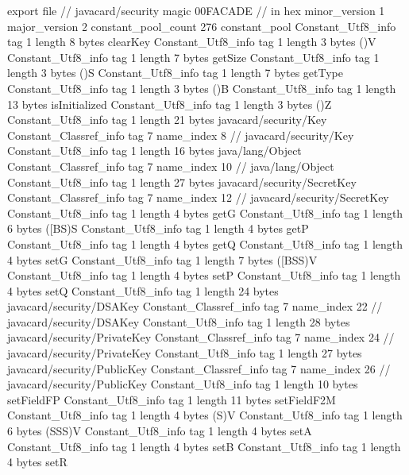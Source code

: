 export file {		// javacard/security
	magic	00FACADE		 // in hex
	minor_version	1
	major_version	2
	constant_pool_count	276
	constant_pool {
		Constant_Utf8_info {
			tag	1
			length	8
			bytes	clearKey
		}
		Constant_Utf8_info {
			tag	1
			length	3
			bytes	()V
		}
		Constant_Utf8_info {
			tag	1
			length	7
			bytes	getSize
		}
		Constant_Utf8_info {
			tag	1
			length	3
			bytes	()S
		}
		Constant_Utf8_info {
			tag	1
			length	7
			bytes	getType
		}
		Constant_Utf8_info {
			tag	1
			length	3
			bytes	()B
		}
		Constant_Utf8_info {
			tag	1
			length	13
			bytes	isInitialized
		}
		Constant_Utf8_info {
			tag	1
			length	3
			bytes	()Z
		}
		Constant_Utf8_info {
			tag	1
			length	21
			bytes	javacard/security/Key
		}
		Constant_Classref_info {
			tag	7
			name_index	8		// javacard/security/Key
		}
		Constant_Utf8_info {
			tag	1
			length	16
			bytes	java/lang/Object
		}
		Constant_Classref_info {
			tag	7
			name_index	10		// java/lang/Object
		}
		Constant_Utf8_info {
			tag	1
			length	27
			bytes	javacard/security/SecretKey
		}
		Constant_Classref_info {
			tag	7
			name_index	12		// javacard/security/SecretKey
		}
		Constant_Utf8_info {
			tag	1
			length	4
			bytes	getG
		}
		Constant_Utf8_info {
			tag	1
			length	6
			bytes	([BS)S
		}
		Constant_Utf8_info {
			tag	1
			length	4
			bytes	getP
		}
		Constant_Utf8_info {
			tag	1
			length	4
			bytes	getQ
		}
		Constant_Utf8_info {
			tag	1
			length	4
			bytes	setG
		}
		Constant_Utf8_info {
			tag	1
			length	7
			bytes	([BSS)V
		}
		Constant_Utf8_info {
			tag	1
			length	4
			bytes	setP
		}
		Constant_Utf8_info {
			tag	1
			length	4
			bytes	setQ
		}
		Constant_Utf8_info {
			tag	1
			length	24
			bytes	javacard/security/DSAKey
		}
		Constant_Classref_info {
			tag	7
			name_index	22		// javacard/security/DSAKey
		}
		Constant_Utf8_info {
			tag	1
			length	28
			bytes	javacard/security/PrivateKey
		}
		Constant_Classref_info {
			tag	7
			name_index	24		// javacard/security/PrivateKey
		}
		Constant_Utf8_info {
			tag	1
			length	27
			bytes	javacard/security/PublicKey
		}
		Constant_Classref_info {
			tag	7
			name_index	26		// javacard/security/PublicKey
		}
		Constant_Utf8_info {
			tag	1
			length	10
			bytes	setFieldFP
		}
		Constant_Utf8_info {
			tag	1
			length	11
			bytes	setFieldF2M
		}
		Constant_Utf8_info {
			tag	1
			length	4
			bytes	(S)V
		}
		Constant_Utf8_info {
			tag	1
			length	6
			bytes	(SSS)V
		}
		Constant_Utf8_info {
			tag	1
			length	4
			bytes	setA
		}
		Constant_Utf8_info {
			tag	1
			length	4
			bytes	setB
		}
		Constant_Utf8_info {
			tag	1
			length	4
			bytes	setR
}}}

